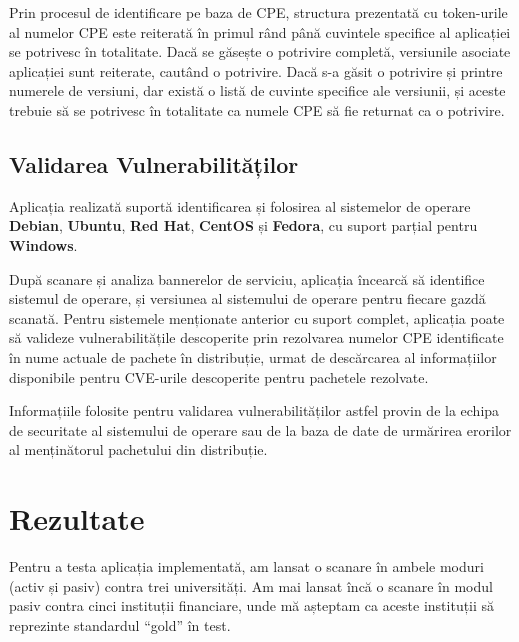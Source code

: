 	Prin procesul de identificare pe baza de CPE, structura prezentată cu token-urile al numelor CPE este reiterată în primul rând până cuvintele specifice al aplicației se potrivesc în totalitate. Dacă se găsește o potrivire completă, versiunile asociate aplicației sunt reiterate, cautând o potrivire. Dacă s-a găsit o potrivire și printre numerele de versiuni, dar există o listă de cuvinte specifice ale versiunii, și aceste trebuie să se potrivesc în totalitate ca numele CPE să fie returnat ca o potrivire.
		
\subsection*{Validarea Vulnerabilităților}

	Aplicația realizată suportă identificarea și folosirea al sistemelor de operare \textbf{Debian}, \textbf{Ubuntu}, \textbf{Red Hat}, \textbf{CentOS} și \textbf{Fedora}, cu suport parțial pentru \textbf{Windows}.
	
	După scanare și analiza bannerelor de serviciu, aplicația încearcă să identifice sistemul de operare, și versiunea al sistemului de operare pentru fiecare gazdă scanată. Pentru sistemele menționate anterior cu suport complet, aplicația poate să valideze vulnerabilitățile descoperite prin rezolvarea numelor CPE identificate în nume actuale de pachete în distribuție, urmat de descărcarea al informațiilor disponibile pentru CVE-urile descoperite pentru pachetele rezolvate.
	
	Informațiile folosite pentru validarea vulnerabilităților astfel provin de la echipa de securitate al sistemului de operare sau de la baza de date de urmărirea erorilor al menținătorul pachetului din distribuție.

\section*{Rezultate}

	Pentru a testa aplicația implementată, am lansat o scanare în ambele moduri (activ și pasiv) contra trei universități. Am mai lansat încă o scanare în modul pasiv contra cinci instituții financiare, unde mă așteptam ca aceste instituții să reprezinte standardul ``gold'' în test.

